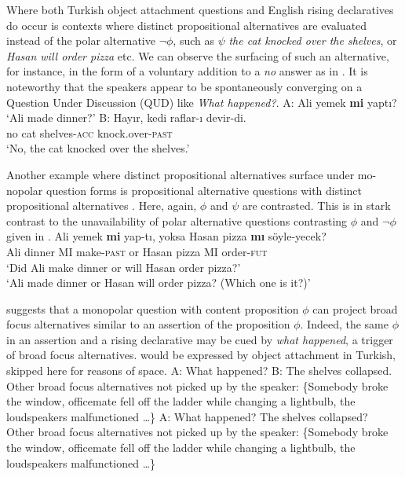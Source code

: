 \documentclass[output=paper,colorlinks,citecolor=brown]{langscibook}
\begin{document}
Where both Turkish object attachment questions and English rising declaratives do occur is contexts where distinct propositional alternatives are evaluated instead of the polar alternative $\neg\phi$, such as $\psi$ \textit{the cat knocked over the shelves}, or \textit{Hasan will order pizza} etc. We can observe the surfacing of such an alternative, for instance, in the form of a voluntary addition to a \textit{no} answer as in . It is noteworthy that the speakers appear to be spontaneously converging on a Question Under Discussion (QUD) \citep{Roberts:1996} like \textit{What happened?}.
\ea \label{ex:11:cat}
A: Ali yemek  \textbf{mi} yaptı?
\glt \phantom{A:}`Ali made dinner?'
\sn B: \gll Hayır, kedi raflar-ı{} devir-di.\\
no cat shelves-\textsc{acc} knock.over-\textsc{past}\\
\glt \phantom{B:} `No, the cat knocked over the shelves.'
\z
 
Another example where distinct propositional alternatives surface under mo-nopolar question forms is propositional alternative questions with distinct propositional alternatives . Here, again, $\phi$ and $\psi$ are contrasted. This is in stark contrast to the unavailability of polar alternative questions contrasting $\phi$ and $\neg\phi$ given in .
\ea\label{propalt-oa}
\gll Ali yemek \textbf{mi} yap-tı, yoksa Hasan pizza \textbf{mı} s\"oyle-yecek?\\
Ali dinner MI make-\textsc{past} or Hasan pizza MI order-\textsc{fut}\\
\glt `Did Ali make dinner or will Hasan order pizza?' \\
`Ali made dinner or Hasan will order pizza? (Which one is it?)'
\z

 suggests that a monopolar question with content proposition $\phi$ can project broad focus alternatives similar to an assertion of the proposition $\phi$. Indeed, the same $\phi$ in an assertion  and a rising declarative  may be cued by \textit{what happened}, a trigger of broad focus alternatives.  would be expressed by object attachment in Turkish, skipped here for reasons of space.
\ea\label{ex:11:32} A: What happened?
\sn B: The shelves collapsed.
\sn Other broad focus alternatives not picked up by the speaker: \{Somebody broke the window, officemate fell off the ladder while changing a lightbulb, the loudspeakers malfunctioned \ldots\}
\ex \label{ex:11:33} A: What happened? The shelves collapsed? \\
\sn Other broad focus alternatives not picked up by the speaker: \{Somebody broke the window, officemate fell off the ladder while changing a lightbulb, the loudspeakers malfunctioned \ldots\}
\z
\end{document}
